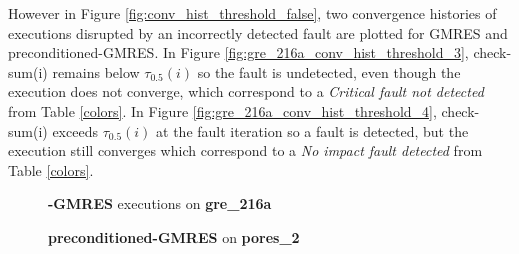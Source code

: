 However in Figure \ref{fig:conv_hist_threshold_false}, two convergence histories of executions disrupted by an incorrectly detected fault are plotted for GMRES and preconditioned-GMRES. In Figure \ref{fig:gre_216a_conv_hist_threshold_3}, check-sum(i) remains below $\tau_{0.5}(i)$ so the fault is undetected, even though the execution does not converge, which correspond to a \emph{Critical fault not detected} from Table \ref{colors}. In Figure \ref{fig:gre_216a_conv_hist_threshold_4}, check-sum(i) exceeds $\tau_{0.5}(i)$ at the fault iteration so a fault is detected, but the execution still converges which correspond to a \emph{No impact fault detected} from Table \ref{colors}. 



\begin{figure}[h]
	\centering
    
\begin{minipage}[b]{0.45\linewidth}
\centering
\textbf{-GMRES} executions on \textbf{gre_216a} 
\end{minipage}
\quad
\begin{minipage}{0.45\linewidth}
\centering
\textbf{preconditioned-GMRES} on \textbf{pores_2}
\end{minipage}\\


    \begin{minipage}[b]{0.48\linewidth}
	

\end{minipage}
\end{figure}
